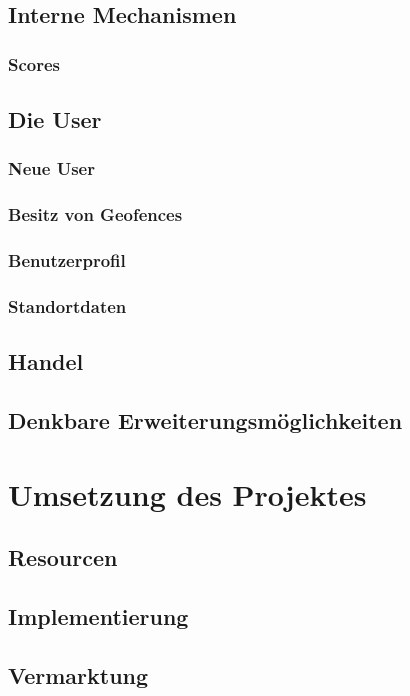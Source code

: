 \documentclass{scrreprt}
\begin{document}
\section{Interne Mechanismen}
\subsection{Scores}


\section{Die User}
\subsection{Neue User}
\subsection{Besitz von Geofences}
\subsection{Benutzerprofil}
\subsection{Standortdaten}

\section{Handel}

\section{Denkbare Erweiterungsmöglichkeiten}

\chapter{Umsetzung des Projektes}
\section{Resourcen}
\section{Implementierung}
\section{Vermarktung}
\end{document}
